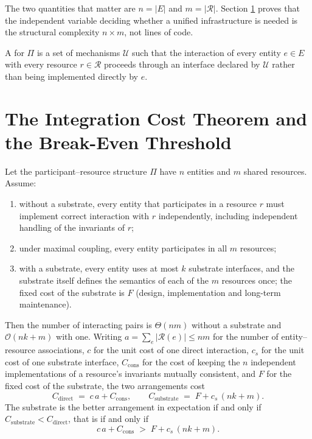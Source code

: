The two quantities that matter are $n = |E|$ and $m = |\mathcal{R}|$. Section
\ref{sec:integration} proves that the independent variable deciding whether a unified
infrastructure is needed is the structural complexity $n \times m$, not lines of code.

\begin{definition}\label{def:substrate}
A  for $\Pi$ is a set of mechanisms $\mathcal{U}$ such that the
interaction of every entity $e \in E$ with every resource $r \in \mathcal{R}$ proceeds
through an interface declared by $\mathcal{U}$ rather than being implemented directly by
$e$.
\end{definition}

\section{The Integration Cost Theorem and the Break-Even Threshold}\label{sec:integration}

\begin{theorem}\label{th:integration}
Let the participant--resource structure $\Pi$ have $n$ entities and $m$ shared resources.
Assume:
\begin{enumerate}[label=(\alph*)]
\item without a substrate, every entity that participates in a resource $r$ must implement
      correct interaction with $r$ independently, including independent handling of the
      invariants of $r$;
\item under maximal coupling, every entity participates in all $m$ resources;
\item with a substrate, every entity uses at most $k$ substrate interfaces, and the
      substrate itself defines the semantics of each of the $m$ resources once; the fixed
      cost of the substrate is $F$ (design, implementation and long-term maintenance).
\end{enumerate}
Then the number of interacting pairs is $\Theta(nm)$ without a substrate and
$\mathcal{O}(nk + m)$ with one. Writing $a = \sum_{e} |\mathcal{R}(e)| \le nm$ for the number of
entity--resource associations, $c$ for the unit cost of one direct interaction, $c_s$ for the unit
cost of one substrate interface, $C_{\mathrm{cons}}$ for the cost of keeping the $n$ independent
implementations of a resource's invariants mutually consistent, and $F$ for the fixed cost of the
substrate, the two arrangements cost
\begin{equation}\label{eq:costs}
C_{\text{direct}} \;=\; c\,a + C_{\mathrm{cons}},
\qquad
C_{\text{substrate}} \;=\; F + c_s\,(n k + m).
\end{equation}
The substrate is the better arrangement in expectation if and only if
$C_{\text{substrate}} < C_{\text{direct}}$, that is if and only if
\begin{equation}\label{eq:threshold}
c\,a + C_{\mathrm{cons}} \;>\; F + c_s\,(n k + m).
\end{equation}
\end{theorem}

